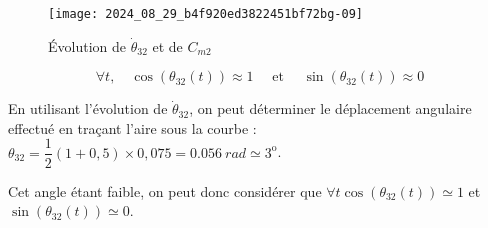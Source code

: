 \else
\fi



\begin{figure}[!h]
\centering
\texttt{[image: 2024\_08\_29\_b4f920ed3822451bf72bg-09]}
\caption{\label{fig_10} Évolution de $\dot{\theta}_{32}$ et de $C_{m 2}$}
\end{figure}

$$
\forall t, \quad \cos \left(\theta_{32}(t)\right) \approx 1 \quad \text { et } \quad \sin \left(\theta_{32}(t)\right) \approx 0
$$
\ifprof
\begin{corrige}
En utilisant l'évolution de $\dot{\theta}_{32}$, on peut déterminer le déplacement angulaire effectué en traçant l'aire sous la courbe :
$\theta_{32}=\dfrac{1}{2}\left( 1+0,5\right)\times 0,075 =\SI{0,056}{rad}\simeq 3^{\text{o}}$.

Cet angle étant faible, on peut donc considérer que $\forall t \cos \left(\theta_{32}(t)\right)\simeq 1$ et $\sin\left(\theta_{32}(t)\right)\simeq 0$.
\end{corrige}
\else
\fi


